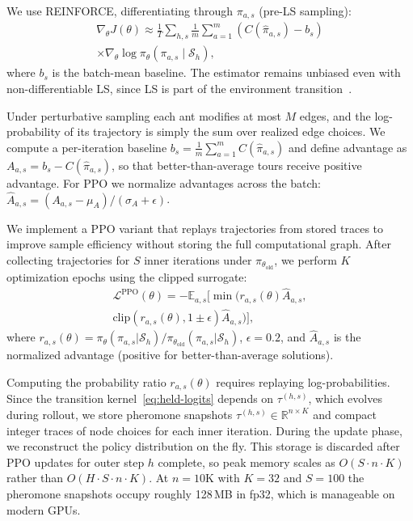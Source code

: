 \documentclass[sigconf,anonymous,review]{acmart}
\theoremstyle{definition}
\theoremstyle{plain}
\newcommand{\R}{\mathbb{R}}
\begin{document}
We use REINFORCE, differentiating through $\pi_{a,s}$ (pre-LS sampling):
\begin{multline}
\nabla_\theta J(\theta) \approx \frac{1}{T} \sum_{h,s} \frac{1}{m} \sum_{a=1}^m (C(\hat{\pi}_{a,s}) - b_s) \\
\times \nabla_\theta \log \pi_\theta(\pi_{a,s} \mid \mathcal{S}_h),
\end{multline}
where $b_s$ is the batch-mean baseline.
The estimator remains unbiased even with non-differentiable LS, since LS is part of the environment transition~\cite{williams1992simple}.

Under perturbative sampling each ant modifies at most $M$ edges, and the log-probability of its trajectory is simply the sum over realized edge choices.
We compute a per-iteration baseline $b_s = \frac{1}{m}\sum_{a=1}^{m} C(\hat{\pi}_{a,s})$ and define advantage as $A_{a,s} = b_s - C(\hat{\pi}_{a,s})$, so that better-than-average tours receive positive advantage.
For PPO we normalize advantages across the batch: $\hat{A}_{a,s} = (A_{a,s} - \mu_A) / (\sigma_A + \epsilon)$.

We implement a PPO variant that replays trajectories from stored traces to improve sample efficiency without storing the full computational graph.
After collecting trajectories for $S$ inner iterations under $\pi_{\theta_{\text{old}}}$, we perform $K$ optimization epochs using the clipped surrogate:
\begin{multline}
\mathcal{L}^{\text{PPO}}(\theta) = -\mathbb{E}_{a,s}\Big[ \min\big( r_{a,s}(\theta) \hat{A}_{a,s}, \\
\text{clip}(r_{a,s}(\theta), 1{\pm}\epsilon) \hat{A}_{a,s} \big) \Big],
\end{multline}
where $r_{a,s}(\theta) = \pi_\theta(\pi_{a,s} | \mathcal{S}_h) / \pi_{\theta_{\text{old}}}(\pi_{a,s} | \mathcal{S}_h)$, $\epsilon=0.2$, and $\hat{A}_{a,s}$ is the normalized advantage (positive for better-than-average solutions).

Computing the probability ratio $r_{a,s}(\theta)$ requires replaying log-probabilities.
Since the transition kernel~\eqref{eq:held-logits} depends on $\tau^{(h,s)}$, which evolves during rollout, we store pheromone snapshots $\tau^{(h,s)} \in \R^{n \times K}$ and compact integer traces of node choices for each inner iteration.
During the update phase, we reconstruct the policy distribution on the fly.
This storage is discarded after PPO updates for outer step $h$ complete, so peak memory scales as $O(S \cdot n \cdot K)$ rather than $O(H \cdot S \cdot n \cdot K)$.
At $n=10$K with $K=32$ and $S=100$ the pheromone snapshots occupy roughly 128\,MB in fp32, which is manageable on modern GPUs.
\end{document}
